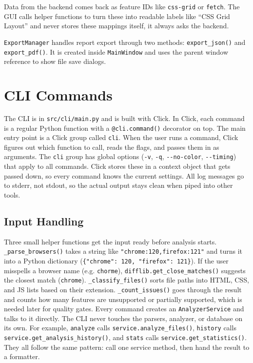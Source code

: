 Data from the backend comes back as feature IDs like \texttt{css-grid} or \texttt{fetch}. The GUI calls helper functions to turn these into readable labels like ``CSS Grid Layout'' and never stores these mappings itself, it always asks the backend.

\texttt{ExportManager} handles report export through two methods: \texttt{export\_json()} and \texttt{export\_pdf()}. It is created inside \texttt{MainWindow} and uses the parent window reference to show file save dialogs.

\section{CLI Commands}
\label{sec:cli}

The CLI is in \texttt{src/cli/main.py} and is built with Click. In Click, each command is a regular Python function with a \texttt{@cli.command()} decorator on top. The main entry point is a Click group called \texttt{cli}. When the user runs a command, Click figures out which function to call, reads the flags, and passes them in as arguments. The \texttt{cli} group has global options (\texttt{-v}, \texttt{-q}, \texttt{-{}-no-color}, \texttt{-{}-timing}) that apply to all commands. Click stores these in a context object that gets passed down, so every command knows the current settings. All log messages go to stderr, not stdout, so the actual output stays clean when piped into other tools.

\subsection{Input Handling}

Three small helper functions get the input ready before analysis starts. \texttt{\_parse\_browsers()} takes a string like \texttt{"chrome:120,firefox:121"} and turns it into a Python dictionary (\texttt{\{"chrome": 120, "firefox": 121\}}). If the user misspells a browser name (e.g. \texttt{chorme}), \texttt{difflib.get\_close\_matches()} suggests the closest match (\texttt{chrome}). \texttt{\_classify\_files()} sorts file paths into HTML, CSS, and JS lists based on their extension. \texttt{\_count\_issues()} goes through the result and counts how many features are unsupported or partially supported, which is needed later for quality gates. Every command creates an \texttt{AnalyzerService} and talks to it directly. The CLI never touches the parsers, analyzer, or database on its own. For example, \texttt{analyze} calls \texttt{service.analyze\_files()}, \texttt{history} calls \texttt{service.get\_analysis\_history()}, and \texttt{stats} calls \texttt{service.get\_statistics()}. They all follow the same pattern: call one service method, then hand the result to a formatter.

